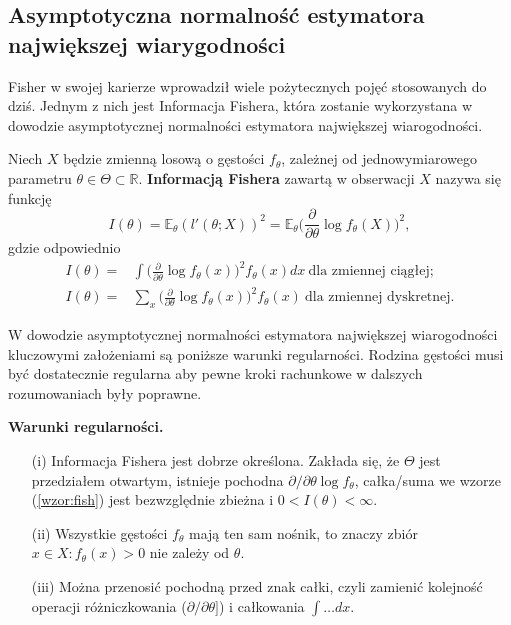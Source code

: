 \newpage
\subsection{Asymptotyczna normalność estymatora największej wiarygodności}


Fisher w swojej karierze wprowadził wiele pożytecznych pojęć stosowanych do dziś. Jednym z nich jest Informacja Fishera, która zostanie wykorzystana w dowodzie asymptotycznej normalności estymatora największej wiarogodności.

\begin{definition}
Niech $X$ będzie zmienną losową o gęstości $f_{\theta}$, zależnej od jednowymiarowego parametru $\theta \in \Theta \subset \mathbb{R}$. \textbf{Informacją Fishera} zawartą w obserwacji $X$ nazywa się funkcję
\begin{equation}\label{wzor:fish}
I(\theta) = \mathbb{E}_{\theta}(l'(\theta;X))^2 = \mathbb{E}_{\theta}\Big(\frac{\partial}{\partial\theta}\log f_{\theta}(X) \Big)^2,
\end{equation}
gdzie odpowiednio
\begin{align*}
I(\theta) = & \int \Big(\frac{\partial}{\partial\theta}\log f_{\theta}(x) \Big)^2 f_{\theta}(x)dx \ \text{dla zmiennej ciągłej;} \\
I(\theta) = & \sum\limits_{x}^{ } \Big(\frac{\partial}{\partial\theta}\log f_{\theta}(x) \Big)^2 f_{\theta}(x) \ \text{dla zmiennej dyskretnej}.
\end{align*}
\end{definition}

W dowodzie asymptotycznej normalności estymatora największej wiarogodności kluczowymi założeniami są poniższe warunki regularności. Rodzina gęstości musi być dostatecznie regularna aby pewne kroki rachunkowe w dalszych rozumowaniach były
poprawne.

\begin{definition}\label{def:regur}
\textbf{Warunki regularności.}
\end{definition}
\begin{itemize}
\item[(i)] Informacja Fishera jest dobrze określona. Zakłada się, że $\Theta$ jest przedziałem
otwartym, istnieje pochodna $\partial/\partial\theta \log f_{\theta}$, całka/suma we wzorze
(\ref{wzor:fish}) jest bezwzględnie zbieżna i $0 < I(\theta) < \infty$.
\item[(ii)] Wszystkie gęstości $f_\theta$ mają ten sam nośnik, to znaczy zbiór ${x \in X : f_\theta(x) > 0}$ nie zależy od $\theta$.
\item[(iii)] Można przenosić pochodną przed znak całki, czyli zamienić kolejność
operacji różniczkowania ($\partial/\partial\theta]$) i całkowania $\int \dots dx$.
\end{itemize}

